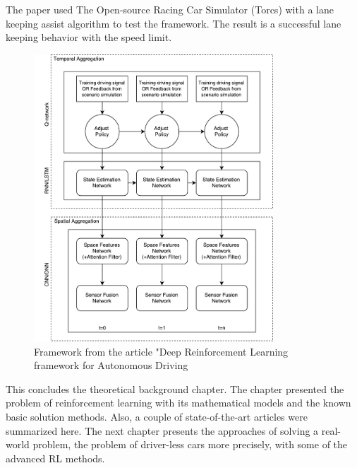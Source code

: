 The paper used The Open-source Racing Car Simulator (Torcs) with a lane keeping assist algorithm to test the framework. The result is a successful lane keeping behavior with the speed limit.       

\begin{figure}[H]
	\centering
	\includegraphics[width=0.8\textwidth]{Figures/TheoreticalBackground/Framework_article}
	\caption{Framework from the article "Deep Reinforcement Learning framework for Autonomous Driving}
	\label{fig:Framework_article}
\end{figure}
 
This concludes the theoretical background chapter. The chapter presented the problem of reinforcement learning with its mathematical models and the known basic solution methods. Also, a couple of state-of-the-art articles were summarized here. The next chapter presents the approaches of solving a real-world problem, the problem of driver-less cars more precisely, with some of the advanced RL methods.
